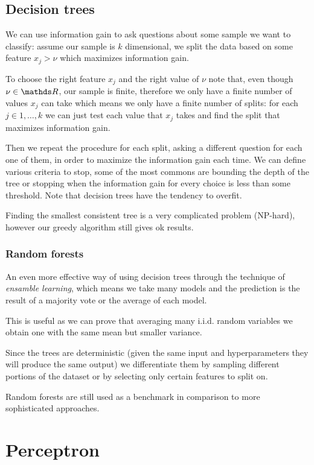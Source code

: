 \documentclass[12pt]{extarticle}
\begin{document}
\subsection{Decision trees}

We can use information gain to ask questions about some sample we want to classify:
assume our sample is $k$ dimensional, we split the data based on some feature $x_j > \nu$ which
maximizes information gain.

To choose the right feature $x_j$ and the right value of $\nu$ note that, even though $\nu \in \R$,
our sample is finite, therefore we only have a finite number of values $x_j$ can take which means
we only have a finite number of splits: for each $j \in 1, \dots, k$ we can just test each value
that $x_j$ takes and find the split that maximizes information gain.

Then we repeat the procedure for each split, asking a different question for each one of them, in
order to maximize the information gain each time.
We can define various criteria to stop, some of the most commons are bounding the depth of the
tree or stopping when the information gain for every choice is less than some threshold.
Note that decision trees have the tendency to overfit.

Finding the smallest consistent tree is a very complicated problem (NP-hard), however our greedy
algorithm still gives ok results.

\subsubsection{Random forests}

An even more effective way of using decision trees through the technique of
\emph{ensamble learning}, which means we take many models and the prediction is the result of a
majority vote or the average of each model.

This is useful as we can prove that averaging many i.i.d. random variables we obtain one with the
same mean but smaller variance.

Since the trees are deterministic (given the same input and hyperparameters they will produce the
same output) we differentiate them by sampling different portions of the dataset or by selecting
only certain features to split on.

Random forests are still used as a benchmark in comparison to more sophisticated approaches.


\section{Perceptron}
\end{document}
